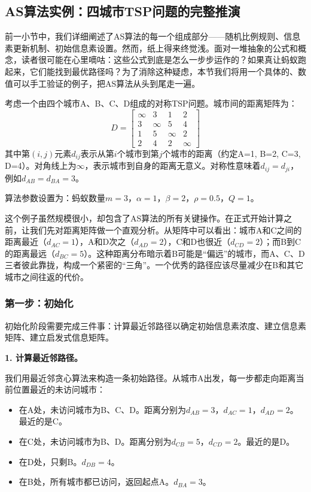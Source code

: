 \documentclass[lang=cn,zihao=-4,a4paper,fontset=windows]{beautybook}
\begin{document}
\subsection{AS算法实例：四城市TSP问题的完整推演}

前一小节中，我们详细阐述了AS算法的每一个组成部分——随机比例规则、信息素更新机制、初始信息素设置。然而，纸上得来终觉浅。面对一堆抽象的公式和概念，读者很可能在心里嘀咕：这些公式到底是怎么一步步运作的？如果真让蚂蚁跑起来，它们能找到最优路径吗？为了消除这种疑虑，本节我们将用一个具体的、数值可以手工验证的例子，把AS算法从头到尾走一遍。

\begin{example}[][四城市TSP问题]
考虑一个由四个城市A、B、C、D组成的对称TSP问题。城市间的距离矩阵为：
\[
D = \begin{bmatrix}
\infty & 3 & 1 & 2 \\
3 & \infty & 5 & 4 \\
1 & 5 & \infty & 2 \\
2 & 4 & 2 & \infty
\end{bmatrix}
\]
其中第$(i,j)$元素$d_{ij}$表示从第$i$个城市到第$j$个城市的距离（约定A=1, B=2, C=3, D=4）。对角线上为$\infty$，表示城市到自身的距离无意义。对称性意味着$d_{ij} = d_{ji}$，例如$d_{AB} = d_{BA} = 3$。

算法参数设置为：蚂蚁数量$m=3$，$\alpha=1$，$\beta=2$，$\rho=0.5$，$Q=1$。
\end{example}

这个例子虽然规模很小，却包含了AS算法的所有关键操作。在正式开始计算之前，让我们先对距离矩阵做一个直观分析。从矩阵中可以看出：城市A和C之间的距离最近（$d_{AC}=1$），A和D次之（$d_{AD}=2$），C和D也很近（$d_{CD}=2$）；而B到C的距离最远（$d_{BC}=5$）。这种距离分布暗示着B可能是“偏远”的城市，而A、C、D三者彼此靠拢，构成一个紧密的“三角”。一个优秀的路径应该尽量减少在B和其它城市之间往返的代价。

\subsubsection{第一步：初始化}

初始化阶段需要完成三件事：计算最近邻路径以确定初始信息素浓度、建立信息素矩阵、建立启发式信息矩阵。

\textbf{1. 计算最近邻路径。}

我们用最近邻贪心算法来构造一条初始路径。从城市A出发，每一步都走向距离当前位置最近的未访问城市：
\begin{itemize}
    \item 在A处，未访问城市为B、C、D。距离分别为$d_{AB}=3$，$d_{AC}=1$，$d_{AD}=2$。最近的是C。
    \item 在C处，未访问城市为B、D。距离分别为$d_{CB}=5$，$d_{CD}=2$。最近的是D。
    \item 在D处，只剩B。$d_{DB}=4$。
    \item 在B处，所有城市都已访问，返回起点A。$d_{BA}=3$。
\end{itemize}
\end{document}
